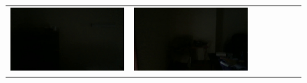 \documentclass[letterpaper, 10 pt, conference]{ieeeconf}  %
\begin{document}
\begin{figure}
\begin{tabular*}{\textwidth}{ccccccc}
 \includegraphics[width=\imgW,height=\imgH]{rio-r6} &
 \includegraphics[width=\imgW,height=\imgH]{rio-r8} \\


\end{tabular*}
\end{figure}
\end{document}
